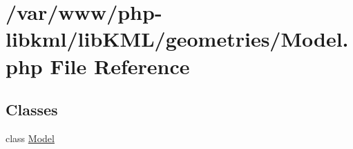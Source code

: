 \hypertarget{Model_8php}{
\section{/var/www/php-\/libkml/libKML/geometries/Model.php File Reference}
\label{d5/d70/Model_8php}
}
\subsection*{Classes}
\begin{DoxyCompactItemize}
\item 
class \hyperlink{classModel}{Model}
\end{DoxyCompactItemize}
